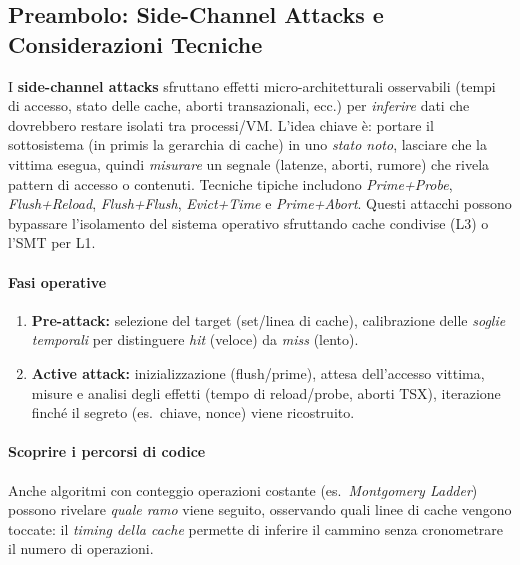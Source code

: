 \subsection{Preambolo: Side-Channel Attacks e Considerazioni Tecniche}
I \textbf{side-channel attacks} sfruttano effetti micro-architetturali osservabili (tempi di accesso, stato delle cache, aborti transazionali, ecc.) per \emph{inferire} dati che dovrebbero restare isolati tra processi/VM. L’idea chiave è: portare il sottosistema (in primis la gerarchia di cache) in uno \emph{stato noto}, lasciare che la vittima esegua, quindi \emph{misurare} un segnale (latenze, aborti, rumore) che rivela pattern di accesso o contenuti. Tecniche tipiche includono \emph{Prime+Probe}, \emph{Flush+Reload}, \emph{Flush+Flush}, \emph{Evict+Time} e \emph{Prime+Abort}. Questi attacchi possono bypassare l’isolamento del sistema operativo sfruttando cache condivise (L3) o l’SMT per L1.

\paragraph{Fasi operative}
\begin{enumerate}
  \item \textbf{Pre-attack:} selezione del target (set/linea di cache), calibrazione delle \emph{soglie temporali} per distinguere \emph{hit} (veloce) da \emph{miss} (lento).
  \item \textbf{Active attack:} inizializzazione (flush/prime), attesa dell’accesso vittima, misure e analisi degli effetti (tempo di reload/probe, aborti TSX), iterazione finché il segreto (es.\ chiave, nonce) viene ricostruito.
\end{enumerate}

\paragraph{Scoprire i percorsi di codice}
Anche algoritmi con conteggio operazioni costante (es.\ \emph{Montgomery Ladder}) possono rivelare \emph{quale ramo} viene seguito, osservando quali linee di cache vengono toccate: il \emph{timing della cache} permette di inferire il cammino senza cronometrare il numero di operazioni.


